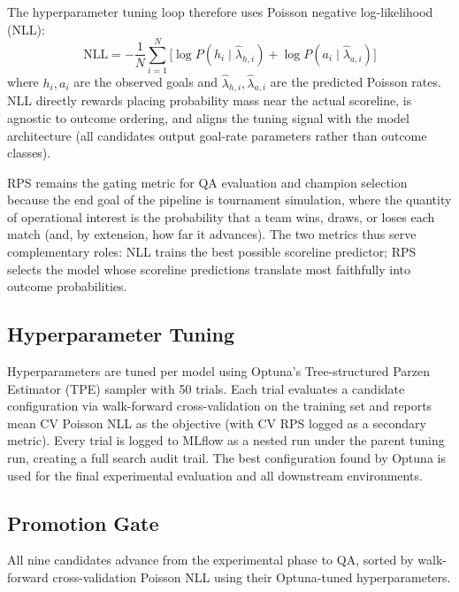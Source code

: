 \documentclass[conference]{IEEEtran}
\begin{document}
The hyperparameter tuning loop therefore uses Poisson negative log-likelihood (NLL):
\begin{equation}
  \text{NLL} = -\frac{1}{N}\sum_{i=1}^{N}
  \bigl[\log P(h_i \mid \hat{\lambda}_{h,i})
       + \log P(a_i \mid \hat{\lambda}_{a,i})\bigr]
\end{equation}
where $h_i, a_i$ are the observed goals and $\hat{\lambda}_{h,i}, \hat{\lambda}_{a,i}$
are the predicted Poisson rates. NLL directly rewards placing probability mass near
the actual scoreline, is agnostic to outcome ordering, and aligns the tuning signal
with the model architecture (all candidates output goal-rate parameters rather than
outcome classes).

RPS remains the gating metric for QA evaluation and champion selection because the
end goal of the pipeline is tournament simulation, where the quantity of operational
interest is the probability that a team wins, draws, or loses each match (and, by
extension, how far it advances). The two metrics thus serve complementary roles:
NLL trains the best possible scoreline predictor; RPS selects the model whose
scoreline predictions translate most faithfully into outcome probabilities.

\subsection{Hyperparameter Tuning}

Hyperparameters are tuned per model using Optuna's Tree-structured Parzen Estimator
(TPE) sampler with 50 trials. Each trial evaluates a candidate configuration via
walk-forward cross-validation on the training set and reports mean CV Poisson NLL as the
objective (with CV RPS logged as a secondary metric). Every trial is logged to MLflow as a nested run under the parent tuning run,
creating a full search audit trail. The best configuration found by Optuna is used for
the final experimental evaluation and all downstream environments.

\subsection{Promotion Gate}
\label{sec:promotion_gate}

All nine candidates advance from the experimental phase to QA, sorted by walk-forward
cross-validation Poisson NLL using their Optuna-tuned hyperparameters.
\end{document}
